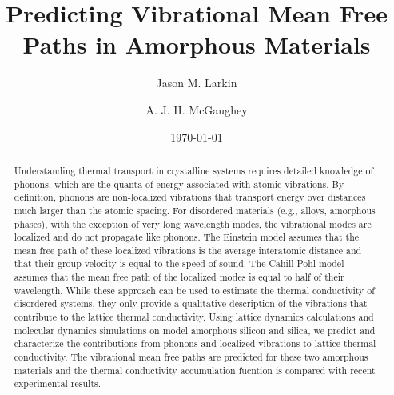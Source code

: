 \documentclass[aps,prb,preprint,superscriptaddress,amsmath,amssymb,floatfix]{revtex4}
\begin{document}
\title{Predicting Vibrational Mean Free Paths in Amorphous Materials}
\author{Jason M. Larkin}
\author{A. J. H. McGaughey}
\date{\today}
\begin{abstract}
Understanding thermal transport in crystalline systems requires detailed 
knowledge of phonons, which are the quanta of energy associated with atomic 
vibrations. By definition, phonons are non-localized vibrations that 
transport energy over distances much larger than the atomic spacing. For 
disordered materials (e.g., alloys, amorphous phases), with the exception 
of very long wavelength modes, the vibrational modes are localized and do 
not propagate like phonons. The Einstein model assumes that the mean free 
path of these localized vibrations is the average interatomic distance and 
that their group velocity is equal to the speed of sound. The Cahill-Pohl 
model assumes that the mean free path of the localized modes is equal to 
half of their wavelength. While these approach can be used to estimate the 
thermal conductivity of disordered systems, they only 
provide a qualitative description of the vibrations that contribute to the 
lattice thermal conductivity.
Using lattice dynamics calculations and molecular dynamics simulations on 
model amorphous silicon and silica, we predict and 
characterize the contributions from phonons and localized vibrations to 
lattice thermal conductivity. The vibrational mean free paths are 
predicted for these two amorphous materials and the thermal 
conductivity accumulation fucntion is compared with recent experimental 
results.

\end{abstract}
\maketitle
\clearpage
\end{document}
